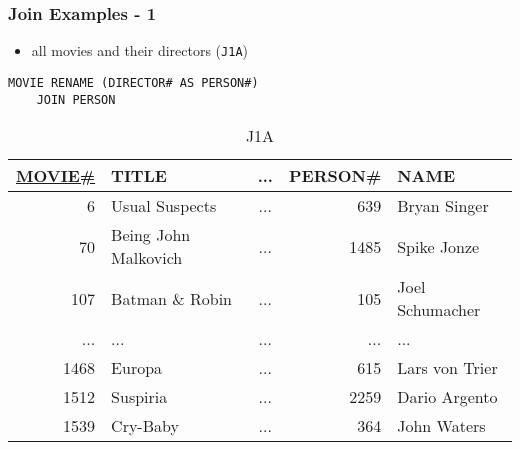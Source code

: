 \documentclass[dvipsnames]{beamer}
\theoremstyle{plain}
\begin{document}
\begin{frame}[fragile]
  \frametitle{Join Examples - 1}

  \begin{example}
    \begin{itemize}
      \item all movies and their directors (\texttt{J1A})
    \end{itemize}

    \begin{lstlisting}
MOVIE RENAME (DIRECTOR# AS PERSON#)
    JOIN PERSON
    \end{lstlisting}

    \pause
    \vspace{-10pt}
    \begin{tiny}
    \begin{table}
      \caption{J1A}
      \begin{tabular}{|r|l|c|r|l|}\hline
\underline{MOVIE\#} & TITLE & ... & PERSON\# & NAME            \\[2pt]\hline\hline
   6 & Usual Suspects       & ... &     639  & Bryan Singer    \\\hline
  70 & Being John Malkovich & ... &    1485  & Spike Jonze     \\\hline
 107 & Batman \& Robin      & ... &     105  & Joel Schumacher \\\hline
 ... & ...                  & ... &     ...  & ...             \\\hline
1468 & Europa               & ... &     615  & Lars von Trier  \\\hline
1512 & Suspiria             & ... &    2259  & Dario Argento   \\\hline
1539 & Cry-Baby             & ... &     364  & John Waters     \\\hline
      \end{tabular}
    \end{table}
    \end{tiny}
  \end{example}
\end{frame}
\end{document}
